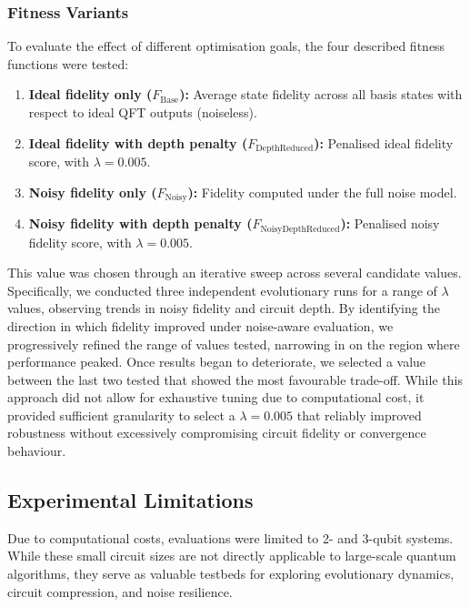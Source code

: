 \documentclass[11pt,a4paper]{article}
\begin{document}
\subsubsection*{Fitness Variants}
To evaluate the effect of different optimisation goals, the four described fitness functions were tested:

\begin{enumerate}
    \item \textbf{Ideal fidelity only ($F_{\text{Base}}$):} Average state fidelity across all basis states with respect to ideal QFT outputs (noiseless).
    
    \item \textbf{Ideal fidelity with depth penalty ($F_\text{DepthReduced}$):} Penalised ideal fidelity score, with $\lambda = 0.005$.
    
    \item \textbf{Noisy fidelity only ($F_{\text{Noisy}}$):} Fidelity computed under the full noise model.
    
    \item \textbf{Noisy fidelity with depth penalty ($F_{\text{NoisyDepthReduced}}$):} Penalised noisy fidelity score, with $\lambda = 0.005$.
\end{enumerate}

This value was chosen through an iterative sweep across several candidate values. Specifically, we conducted three independent evolutionary runs for a range of $\lambda$ values, observing trends in noisy fidelity and circuit depth. By identifying the direction in which fidelity improved under noise-aware evaluation, we progressively refined the range of values tested, narrowing in on the region where performance peaked. Once results began to deteriorate, we selected a value between the last two tested that showed the most favourable trade-off. While this approach did not allow for exhaustive tuning due to computational cost, it provided sufficient granularity to select a $\lambda=0.005$ that reliably improved robustness without excessively compromising circuit fidelity or convergence behaviour.

\subsection{Experimental Limitations}
Due to computational costs, evaluations were limited to 2- and 3-qubit systems. While these small circuit sizes are not directly applicable to large-scale quantum algorithms, they serve as valuable testbeds for exploring evolutionary dynamics, circuit compression, and noise resilience.\newline
\end{document}
